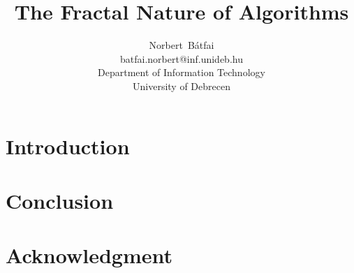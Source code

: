 \documentclass[a4paper]{article}
\begin{document}
\title{The Fractal Nature of Algorithms}
\author{Norbert~B\'atfai\\batfai.norbert@inf.unideb.hu\\Department of Information Technology\\University of Debrecen}

\maketitle

\begin{abstract}

\end{abstract}

\section{Introduction}



\section{Conclusion}

\section{Acknowledgment}


\end{document}

